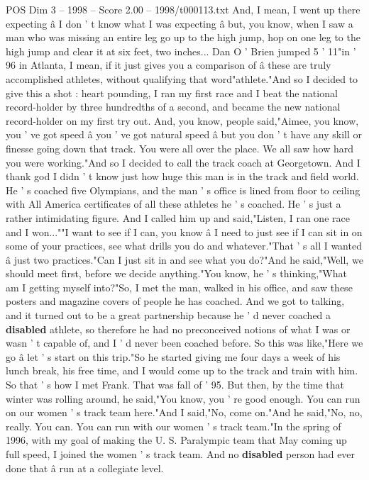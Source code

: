 \begin{textsample}{POS Dim 3 – 1998 – Score 2.00 – 1998/t000113.txt}
And, I mean, I went up there expecting â I don ' t know what I was expecting â but, you know, when I saw a man who was missing an entire leg go up to the high jump, hop on one leg to the high jump and clear it at six feet, two inches...
Dan O ' Brien jumped 5 ' 11"in ' 96 in Atlanta, I mean, if it just gives you a comparison of â these are truly accomplished athletes, without qualifying that word"athlete."And so I decided to give this a shot : heart pounding, I ran my first race and I beat the national record-holder by three hundredths of a second, and became the new national record-holder on my first try out.
And, you know, people said,"Aimee, you know, you ' ve got speed â you ' ve got natural speed â but you don ' t have any skill or finesse going down that track.
You were all over the place.
We all saw how hard you were working."And so I decided to call the track coach at Georgetown.
And I thank god I didn ' t know just how huge this man is in the track and field world.
He ' s coached five Olympians, and the man ' s office is lined from floor to ceiling with All America certificates of all these athletes he ' s coached.
He ' s just a rather intimidating figure.
And I called him up and said,"Listen, I ran one race and I won...""I want to see if I can, you know â I need to just see if I can sit in on some of your practices, see what drills you do and whatever."That ' s all I wanted â just two practices."Can I just sit in and see what you do?"And he said,"Well, we should meet first, before we decide anything."You know, he ' s thinking,"What am I getting myself into?"So, I met the man, walked in his office, and saw these posters and magazine covers of people he has coached.
And we got to talking, and it turned out to be a great partnership because he ' d never coached a \textbf{disabled} athlete, so therefore he had no preconceived notions of what I was or wasn ' t capable of, and I ' d never been coached before.
So this was like,"Here we go â let ' s start on this trip."So he started giving me four days a week of his lunch break, his free time, and I would come up to the track and train with him.
So that ' s how I met Frank.
That was fall of ' 95.
But then, by the time that winter was rolling around, he said,"You know, you ' re good enough.
You can run on our women ' s track team here."And I said,"No, come on."And he said,"No, no, really.
You can.
You can run with our women ' s track team."In the spring of 1996, with my goal of making the U.
S.
Paralympic team that May coming up full speed, I joined the women ' s track team.
And no \textbf{disabled} person had ever done that â run at a collegiate level.

\end{textsample}
